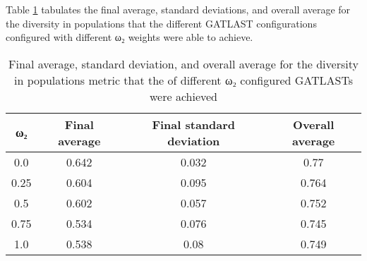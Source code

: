 Table \ref{tab:HP:GA:MWeight:diversity in populations} tabulates the final average, standard deviations, and overall average for the diversity in populations that the different GATLAST configurations configured with different ω₂ weights were able to achieve.
\begin{table}[tbh!]
\centering
\begin{adjustbox}{trim=0cm 0cm 0cm 0cm, clip=true}
\begin{tabular}{|c|c|c|c|}
\hline
ω₂ & Final average & Final standard deviation & Overall average\\
\hline
0.0 & 0.642 & 0.032 & 0.77\\\hline
0.25 & 0.604 & 0.095 & 0.764\\\hline
0.5 & 0.602 & 0.057 & 0.752\\\hline
0.75 & 0.534 & 0.076 & 0.745\\\hline
1.0 & 0.538 & 0.08 & 0.749\\\hline
\end{tabular}
\end{adjustbox}
\caption{Final average, standard deviation, and overall average for the diversity in populations metric that the of different ω₂ configured GATLASTs were achieved}
\label{tab:HP:GA:MWeight:diversity in populations}
\end{table}
